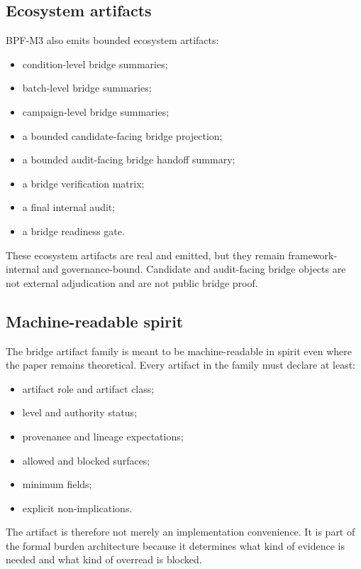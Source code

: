 \documentclass[11pt,a4paper]{article}
\theoremstyle{definition}
\begin{document}
\subsection{Ecosystem artifacts}
BPF-M3 also emits bounded ecosystem artifacts:
\begin{itemize}[leftmargin=1.5em]
\item condition-level bridge summaries;
\item batch-level bridge summaries;
\item campaign-level bridge summaries;
\item a bounded candidate-facing bridge projection;
\item a bounded audit-facing bridge handoff summary;
\item a bridge verification matrix;
\item a final internal audit;
\item a bridge readiness gate.
\end{itemize}
These ecosystem artifacts are real and emitted, but they remain framework-internal and governance-bound. Candidate and audit-facing bridge objects are not external adjudication and are not public bridge proof.

\subsection{Machine-readable spirit}
The bridge artifact family is meant to be machine-readable in spirit even where the paper remains theoretical. Every artifact in the family must declare at least:
\begin{itemize}[leftmargin=1.5em]
\item artifact role and artifact class;
\item level and authority status;
\item provenance and lineage expectations;
\item allowed and blocked surfaces;
\item minimum fields;
\item explicit non-implications.
\end{itemize}
The artifact is therefore not merely an implementation convenience. It is part of the formal burden architecture because it determines what kind of evidence is needed and what kind of overread is blocked.
\end{document}

